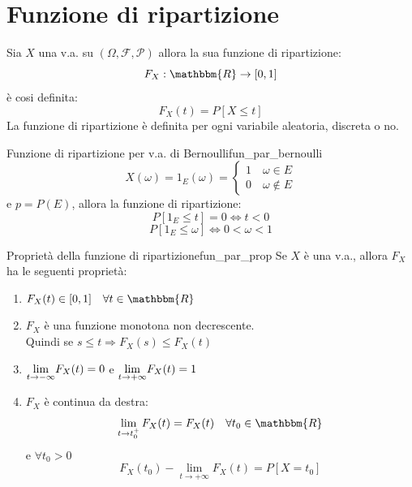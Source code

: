 \documentclass[12pt]{report}
\newcounter{theorem}
\newcommand{\nmu}{}
\begin{document}
  	 	\section{Funzione di ripartizione}
  	 	Sia $X$ una v.a. su $(\Omega, \mathcal{F}, \mathcal{P})$ allora la sua funzione di ripartizione:
  	 	\[
  	 	F_X: \mathbbm{R} \to [0,1]
  	 	\]
  	 	è cosi definita:
  	 	\[
  	 	F_X(t) = P[X \leq t]
  	 	\]
  	 	La funzione di ripartizione è definita per ogni variabile aleatoria, discreta o no.
  	 	\begin{example}{\nmu Funzione di ripartizione per v.a. di Bernoulli}{fun_par_bernoulli}
  	 		\[
  	 		X(\omega) = 1_E(\omega) = \begin{cases}
  	 			1 \quad \omega \in E \\
  	 			0 \quad \omega \notin E
  	 		\end{cases}
  	 		\]
  	 		e $p = P(E)$, allora la funzione di ripartizione:
  	 		\[
  	 		P[1_E \leq t] = 0 \iff t < 0
  	 		\]
  	 		\[
  	 		P[1_E\leq \omega] \iff 0 < \omega < 1
  	 		\]
  	 	\end{example}
  	 	\begin{theorem}{\nmu Proprietà della funzione di ripartizione}{fun_par_prop}
  	 		Se $X$ è una v.a., allora $F_X$ ha le seguenti proprietà:
  	 		\begin{enumerate}
  	 			\item $F_X(t) \in [0, 1] \quad  \forall t \in \mathbbm{R}$
  	 			\item $F_X$ è una funzione monotona non decrescente. \\ Quindi se $s \leq t \Rightarrow F_X(s) \leq F_X(t)$
  	 			\item $\mathlarger{\lim_{t \to -\infty}} F_X(t)=0$ e $\mathlarger{\lim_{t \to +\infty}}F_X(t) = 1$
  	 			\item $F_X$ è continua da destra:
  	 			\[
  	 			\lim_{t \to t_0^+}F_X(t) = F_X(t) \quad \forall t_0 \in \mathbbm{R}
  	 			\]
  	 			e $\forall t_0 > 0$
  	 			\[
  	 			F_X(t_0) - \lim_{t \to +\infty}F_X(t) = P[X=t_0]
  	 			\]
  	 		\end{enumerate}
  	 	\end{theorem}
\end{document}
